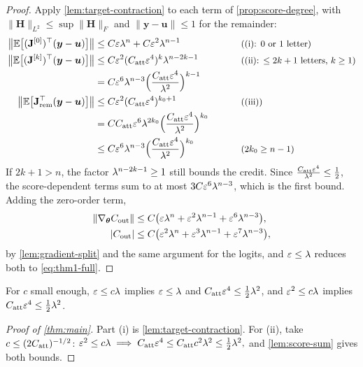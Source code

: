 \begin{proof}
Apply \cref{lem:target-contraction} to each term of \cref{prop:score-degree}, with $\|\mathbf H\|_{L^2}\le\sup\|\mathbf H\|_F$ and $\|\bm y-\bm u\|\le1$ for the remainder:
\begin{alignat*}{2}
 \bigl\|\E\bigl[(\mathbf J^{[0]})^\top(\bm y-\bm u)\bigr]\bigr\|&\le C\initscale\mixrate^n+C\initscale^2\mixrate^{n-1} &\qquad& \why{(i): $0$ or $1$ letter}\\
 \bigl\|\E\bigl[(\mathbf J^{[k]})^\top(\bm y-\bm u)\bigr]\bigr\|&\le C\initscale^2(\attconst\initscale^4)^k\mixrate^{n-2k-1} && \why{(ii): $\le2k+1$ letters, $k\ge1$}\\
 &=C\initscale^6\mixrate^{n-3}\Bigl(\frac{\attconst\initscale^4}{\mixrate^2}\Bigr)^{k-1} && \\
 \bigl\|\E\bigl[\mathbf J_{\mathrm{rem}}^\top(\bm y-\bm u)\bigr]\bigr\|&\le C\initscale^2(\attconst\initscale^4)^{k_0+1} && \why{(iii)}\\
 &=C\attconst\initscale^6\mixrate^{2k_0}\Bigl(\frac{\attconst\initscale^4}{\mixrate^2}\Bigr)^{k_0} && \\
 &\le C\initscale^6\mixrate^{n-3}\Bigl(\frac{\attconst\initscale^4}{\mixrate^2}\Bigr)^{k_0} && \why{$2k_0\ge n-1$}
\end{alignat*}
If $2k+1>n$, the factor $\lambda^{n-2k-1}\ge1$ still bounds the credit. Since $\frac{C_{\mathrm{att}}\varepsilon^4}{\lambda^2}\le\frac{1}{2}$, the
score-dependent terms sum to at most $3C\varepsilon^6\lambda^{n-3}$, which is the first bound. Adding the zero-order term,
\begin{align*}
 \|\nabla_{\bm\theta}C_{\mathrm{out}}\|&\le C\bigl(\varepsilon\lambda^n+\varepsilon^2\lambda^{n-1}+\varepsilon^6\lambda^{n-3}\bigr),\\
 |C_{\mathrm{out}}|&\le C\bigl(\varepsilon^2\lambda^n+\varepsilon^3\lambda^{n-1}+\varepsilon^7\lambda^{n-3}\bigr),
\end{align*}
by \cref{lem:gradient-split} and the same argument for the logits, and $\varepsilon\le\lambda$ reduces both to \cref{eq:thm1-full}.
\end{proof}

For $c$ small enough, $\varepsilon\le c\lambda$ implies $\varepsilon\le\lambda$ and $C_{\mathrm{att}}\varepsilon^4\le\frac{1}{2}\lambda^2$, and $\varepsilon^2\le c\lambda$ implies $C_{\mathrm{att}}\varepsilon^4\le\frac{1}{2}\lambda^2$.

\begin{proof}[Proof of \cref{thm:main}]
Part (i) is \cref{lem:target-contraction}. For (ii), take $c\le(2C_{\mathrm{att}})^{-1/2}$:
 $\initscale^2\le c\mixrate\implies \attconst\initscale^4\le\attconst c^2\mixrate^2\le\tfrac{1}{2}\mixrate^2,$ 
and \cref{lem:score-sum} gives both bounds.
\end{proof}

